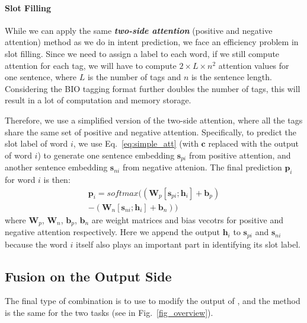 \paragraph{Slot Filling}
While we can apply the same \textbf{\emph{two-side attention}} (positive and negative attention) method as we do in intent prediction, we face an efficiency problem in slot filling. 
Since we need to assign a label to each word, if we still compute attention for each tag, we will have to compute $2\times L \times n^2$ attention values for one sentence, where $L$ is the number of tags and $n$ is the sentence length. Considering the BIO tagging format further doubles the number of tags, this will result in a lot of computation and memory storage. 

Therefore, we use a simplified version of the two-side attention, where all the tags share the same set of positive and negative attention.
Specifically, to predict the slot label of word $i$, we use Eq.~\ref{eq:simple_att} (with $\textbf{c}$ replaced with the \BLSTM output of word $i$) to generate one sentence embedding $\textbf{s}_{pi}$ from positive attention, and another sentence embedding $\textbf{s}_{ni}$ from negative attenion.
The final prediction $\textbf{p}_i$ for word $i$ is then:
\begin{equation}
\begin{split}
\textbf{p}_i = softmax((\textbf{W}_p [\textbf{s}_{pi}; \textbf{h}_i] + \textbf{b}_p) \\- (\textbf{W}_n [\textbf{s}_{ni}; \textbf{h}_i] + \textbf{b}_n))
\end{split} 
\end{equation} 
where $\textbf{W}_{p}$, $\textbf{W}_{n}$, $\textbf{b}_{p}$, $\textbf{b}_{n}$ are weight matrices and bias vecotrs for positive and negative attention respectively. Here we append the \BLSTM output $\textbf{h}_i$ to $\textbf{s}_{pi}$ and $\textbf{s}_{ni}$ because the word $i$ itself also plays an important part in identifying its slot label.

\subsection{Fusion on the Output Side}
\label{fusion_with_output}
The final type of combination is to use \RE to modify the output of \NN, and the method is the same for the two tasks (see  in Fig.~\ref{fig_overview}). 



